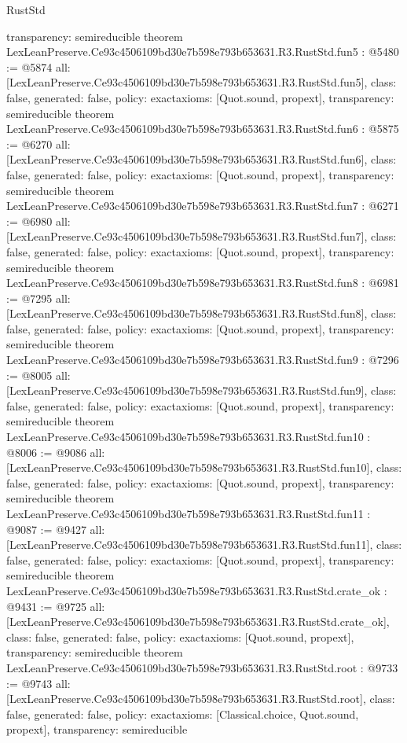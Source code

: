 \begin{lexlean}{RustStd}
\begin{coremodule}
{  transparency: semireducible
}
theorem LexLeanPreserve.Ce93c4506109bd30e7b598e793b653631.R3.RustStd.fun5 : @5480 := @5874 {
  all: [LexLeanPreserve.Ce93c4506109bd30e7b598e793b653631.R3.RustStd.fun5],
  class: false,
  generated: false,
  policy: exact{axioms: [Quot.sound, propext]},
  transparency: semireducible
}
theorem LexLeanPreserve.Ce93c4506109bd30e7b598e793b653631.R3.RustStd.fun6 : @5875 := @6270 {
  all: [LexLeanPreserve.Ce93c4506109bd30e7b598e793b653631.R3.RustStd.fun6],
  class: false,
  generated: false,
  policy: exact{axioms: [Quot.sound, propext]},
  transparency: semireducible
}
theorem LexLeanPreserve.Ce93c4506109bd30e7b598e793b653631.R3.RustStd.fun7 : @6271 := @6980 {
  all: [LexLeanPreserve.Ce93c4506109bd30e7b598e793b653631.R3.RustStd.fun7],
  class: false,
  generated: false,
  policy: exact{axioms: [Quot.sound, propext]},
  transparency: semireducible
}
theorem LexLeanPreserve.Ce93c4506109bd30e7b598e793b653631.R3.RustStd.fun8 : @6981 := @7295 {
  all: [LexLeanPreserve.Ce93c4506109bd30e7b598e793b653631.R3.RustStd.fun8],
  class: false,
  generated: false,
  policy: exact{axioms: [Quot.sound, propext]},
  transparency: semireducible
}
theorem LexLeanPreserve.Ce93c4506109bd30e7b598e793b653631.R3.RustStd.fun9 : @7296 := @8005 {
  all: [LexLeanPreserve.Ce93c4506109bd30e7b598e793b653631.R3.RustStd.fun9],
  class: false,
  generated: false,
  policy: exact{axioms: [Quot.sound, propext]},
  transparency: semireducible
}
theorem LexLeanPreserve.Ce93c4506109bd30e7b598e793b653631.R3.RustStd.fun10 : @8006 := @9086 {
  all: [LexLeanPreserve.Ce93c4506109bd30e7b598e793b653631.R3.RustStd.fun10],
  class: false,
  generated: false,
  policy: exact{axioms: [Quot.sound, propext]},
  transparency: semireducible
}
theorem LexLeanPreserve.Ce93c4506109bd30e7b598e793b653631.R3.RustStd.fun11 : @9087 := @9427 {
  all: [LexLeanPreserve.Ce93c4506109bd30e7b598e793b653631.R3.RustStd.fun11],
  class: false,
  generated: false,
  policy: exact{axioms: [Quot.sound, propext]},
  transparency: semireducible
}
theorem LexLeanPreserve.Ce93c4506109bd30e7b598e793b653631.R3.RustStd.crate_ok : @9431 := @9725 {
  all: [LexLeanPreserve.Ce93c4506109bd30e7b598e793b653631.R3.RustStd.crate_ok],
  class: false,
  generated: false,
  policy: exact{axioms: [Quot.sound, propext]},
  transparency: semireducible
}
theorem LexLeanPreserve.Ce93c4506109bd30e7b598e793b653631.R3.RustStd.root : @9733 := @9743 {
  all: [LexLeanPreserve.Ce93c4506109bd30e7b598e793b653631.R3.RustStd.root],
  class: false,
  generated: false,
  policy: exact{axioms: [Classical.choice, Quot.sound, propext]},
  transparency: semireducible
}


\end{coremodule}
\end{lexlean}
